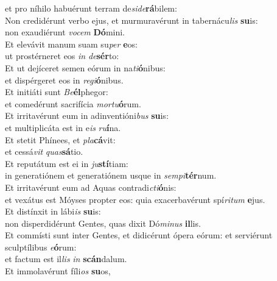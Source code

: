 \evenverse et pro níhilo habuérunt terram de\textit{si}\textit{de}\textbf{rá}bilem:\\
\oddverse Non credidérunt verbo ejus, et murmuravérunt in tabernácu\textit{lis} \textbf{su}is:~\*\\
\oddverse non exaudiérunt \textit{vo}\textit{cem} \textbf{Dó}mini.\\
\evenverse Et elevávit manum suam su\textit{per} \textbf{e}os:~\*\\
\evenverse ut prostérneret eos \textit{in} \textit{de}\textbf{sér}to:\\
\oddverse Et ut dejíceret semen eórum in na\textit{ti}\textbf{ó}nibus:~\*\\
\oddverse et dispérgeret eos in \textit{re}\textit{gi}\textbf{ó}nibus.\\
\evenverse Et initiáti sunt \textit{Be}\textbf{él}phegor:~\*\\
\evenverse et comedérunt sacrifícia \textit{mor}\textit{tu}\textbf{ó}rum.\\
\oddverse Et irritavérunt eum in adinventióni\textit{bus} \textbf{su}is:~\*\\
\oddverse et multiplicáta est in e\textit{is} \textit{ru}\textbf{í}na.\\
\evenverse Et stetit Phínees, et \textit{pla}\textbf{cá}vit:~\*\\
\evenverse et cessá\textit{vit} \textit{quas}\textbf{sá}tio.\\
\oddverse Et reputátum est ei in \textit{ju}\textbf{stí}tiam:~\*\\
\oddverse in generatiónem et generatiónem usque in \textit{sem}\textit{pi}\textbf{tér}num.\\
\evenverse Et irritavérunt eum ad Aquas contradi\textit{cti}\textbf{ó}nis:~\*\\
\evenverse et vexátus est Móyses propter eos: quia exacerbavérunt spí\textit{ri}\textit{tum} \textbf{e}jus.\\
\oddverse Et distínxit in lábi\textit{is} \textbf{su}is:~\*\\
\oddverse non disperdidérunt Gentes, quas dixit Dó\textit{mi}\textit{nus} \textbf{il}lis.\\
\evenverse Et commísti sunt inter Gentes, et didicérunt ópera eórum: et serviérunt sculptílibus \textit{e}\textbf{ó}rum:~\*\\
\evenverse et factum est il\textit{lis} \textit{in} \textbf{scán}dalum.\\
\oddverse Et immolavérunt fíli\textit{os} \textbf{su}os,~\*\\
